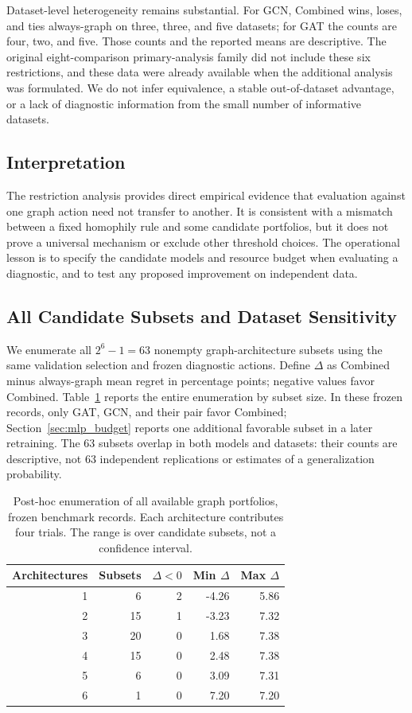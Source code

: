 Dataset-level heterogeneity remains substantial. For GCN, Combined wins, loses, and ties always-graph on three, three, and five datasets; for GAT the counts are four, two, and five. Those counts and the reported means are descriptive. The original eight-comparison primary-analysis family did not include these six restrictions, and these data were already available when the additional analysis was formulated. We do not infer equivalence, a stable out-of-dataset advantage, or a lack of diagnostic information from the small number of informative datasets.

\subsection{Interpretation}

The restriction analysis provides direct empirical evidence that evaluation against one graph action need not transfer to another. It is consistent with a mismatch between a fixed homophily rule and some candidate portfolios, but it does not prove a universal mechanism or exclude other threshold choices. The operational lesson is to specify the candidate models and resource budget when evaluating a diagnostic, and to test any proposed improvement on independent data.

\subsection{All Candidate Subsets and Dataset Sensitivity}
\label{sec:subset_robustness}

We enumerate all $2^6-1=63$ nonempty graph-architecture subsets using the same validation selection and frozen diagnostic actions. Define $\Delta$ as Combined minus always-graph mean regret in percentage points; negative values favor Combined. Table~\ref{tab:subset_sensitivity} reports the entire enumeration by subset size. In these frozen records, only GAT, GCN, and their pair favor Combined; Section~\ref{sec:mlp_budget} reports one additional favorable subset in a later retraining. The 63 subsets overlap in both models and datasets: their counts are descriptive, not 63 independent replications or estimates of a generalization probability.

\begin{table}[t]
\centering
\caption{Post-hoc enumeration of all available graph portfolios, frozen benchmark records. Each architecture contributes four trials. The range is over candidate subsets, not a confidence interval.}
\label{tab:subset_sensitivity}
\small
\begin{tabular}{@{}rrrrr@{}}
\toprule
Architectures & Subsets & $\Delta<0$ & Min $\Delta$ & Max $\Delta$ \\
\midrule
1 & 6 & 2 & -4.26 & 5.86 \\
2 & 15 & 1 & -3.23 & 7.32 \\
3 & 20 & 0 & 1.68 & 7.38 \\
4 & 15 & 0 & 2.48 & 7.38 \\
5 & 6 & 0 & 3.09 & 7.31 \\
6 & 1 & 0 & 7.20 & 7.20 \\
\bottomrule
\end{tabular}
\end{table}

